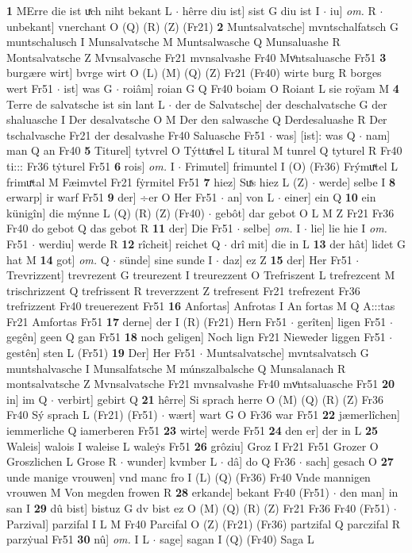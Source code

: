 \documentclass[8pt,a4paper,notitlepage]{article}
\begin{document}
\begin{table}[ht]
\begin{minipage}[t]{0.5\linewidth}
\textbf{1} MErre die ist uͯch niht bekant L  $\cdot$ hêrre diu ist] sist G diu ist I  $\cdot$ iu] \textit{om.} R  $\cdot$ unbekant] vnerchant O (Q) (R) (Z) (Fr21) \textbf{2} Muntsalvatsche] mvntschalfatsch G muntschalusch I Munsalvatsche M Muntsalwasche Q Munsaluashe R Montsalvatsche Z Mvnsalvasche Fr21 mvnsalvashe Fr40 Mvͦntsaluasche Fr51 \textbf{3} burgære wirt] bvrge wirt O (L) (M) (Q) (Z) Fr21 (Fr40) wirte burg R borges wert Fr51  $\cdot$ ist] was G  $\cdot$ roiâm] roian G Q Fr40 boiam O Roiant L sie roÿam M \textbf{4} Terre de salvatsche ist sin lant L  $\cdot$ der de Salvatsche] der deschalvatsche G der shaluasche I Der desalvatsche O M Der den salwasche Q Derdesaluashe R Der tschalvasche Fr21 der desalvashe Fr40 Saluasche Fr51  $\cdot$ was] [ist]: was Q  $\cdot$ nam] man Q an Fr40 \textbf{5} Titurel] tytvrel O Týttuͯrel L titural M tunrel Q tyturel R Fr40 ti::: Fr36 tẏturel Fr51 \textbf{6} rois] \textit{om.} I  $\cdot$ Frimutel] frimuntel I (O) (Fr36) Frýmuͯtel L frimuͯtal M Fæimvtel Fr21 fẏrmitel Fr51 \textbf{7} hiez] Suͯs hiez L (Z)  $\cdot$ werde] selbe I \textbf{8} erwarp] ir warf Fr51 \textbf{9} der] ÷er O Her Fr51  $\cdot$ an] von L  $\cdot$ einer] ein Q \textbf{10} ein künigîn] die mýnne L (Q) (R) (Z) (Fr40)  $\cdot$ gebôt] dar gebot O L M Z Fr21 Fr36 Fr40 do gebot Q das gebot R \textbf{11} der] Die Fr51  $\cdot$ selbe] \textit{om.} I  $\cdot$ lie] lie hie I \textit{om.} Fr51  $\cdot$ werdiu] werde R \textbf{12} rîcheit] reichet Q  $\cdot$ drî mit] die in L \textbf{13} der hât] lidet G hat M \textbf{14} got] \textit{om.} Q  $\cdot$ sünde] sine sunde I  $\cdot$ daz] ez Z \textbf{15} der] Her Fr51  $\cdot$ Trevrizzent] trevrezent G treurezent I treurezzent O Trefriszent L trefrezcent M trischrizzent Q trefrissent R treverzzent Z trefresent Fr21 trefrezent Fr36 trefrizzent Fr40 treuerezent Fr51 \textbf{16} Anfortas] Anfrotas I An fortas M Q A:::tas Fr21 Amfortas Fr51 \textbf{17} derne] der I (R) (Fr21) Hern Fr51  $\cdot$ gerîten] ligen Fr51  $\cdot$ gegên] geen Q gan Fr51 \textbf{18} noch geligen] Noch lign Fr21 Nieweder liggen Fr51  $\cdot$ gestên] sten L (Fr51) \textbf{19} Der] Her Fr51  $\cdot$ Muntsalvatsche] mvntsalvatsch G muntshalvasche I Munsalfatsche M múnszalbalsche Q Munsalanach R montsalvatsche Z Mvnsalvatsche Fr21 mvnsalvashe Fr40 mvͦntsaluasche Fr51 \textbf{20} in] im Q  $\cdot$ verbirt] gebirt Q \textbf{21} hêrre] Si sprach herre O (M) (Q) (R) (Z) Fr36 Fr40 Sý sprach L (Fr21) (Fr51)  $\cdot$ wært] wart G O Fr36 war Fr51 \textbf{22} jæmerlîchen] iemmerliche Q iamerberen Fr51 \textbf{23} wirte] werde Fr51 \textbf{24} den er] der in L \textbf{25} Waleis] walois I waleise L waleẏs Fr51 \textbf{26} grôziu] Groz I Fr21 Fr51 Grozer O Groszlichen L Grose R  $\cdot$ wunder] kvmber L  $\cdot$ dâ] do Q Fr36  $\cdot$ sach] gesach O \textbf{27} unde manige vrouwen] vnd manc fro I (L) (Q) (Fr36) Fr40 Vnde mannigen vrouwen M Von megden frowen R \textbf{28} erkande] bekant Fr40 (Fr51)  $\cdot$ den man] in san I \textbf{29} dû bist] bistuz G dv bist ez O (M) (Q) (R) (Z) Fr21 Fr36 Fr40 (Fr51)  $\cdot$ Parzival] parzifal I L M Fr40 Parcifal O (Z) (Fr21) (Fr36) partzifal Q parczifal R parzẏual Fr51 \textbf{30} nû] \textit{om.} I L  $\cdot$ sage] sagan I (Q) (Fr40) Saga L \newline

\end{minipage}
\end{table}
\end{document}
